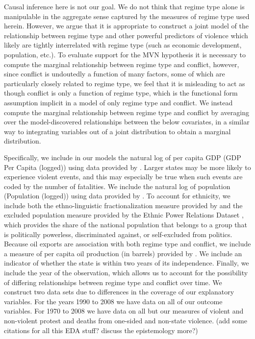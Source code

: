 \documentclass[titlepage, onecolumn,12pt]{article}
\begin{document}
Causal inference here is not our goal. We do not think that regime type alone is manipulable in the aggregate sense captured by the measures of regime type used herein. However, we argue that it is appropriate to construct a joint model of the relationship between regime type and other powerful predictors of violence which likely are tightly interrelated with regime type (such as economic development, population, etc.). To evaluate support for the MVN hypothesis it is necessary to compute the marginal relationship between regime type and conflict, however, since conflict is undoutedly a function of many factors, some of which are particularly closely related to regime type, we feel that it is misleading to act as though conflict is only a function of regime type, which is the functional form assumption implicit in a model of only regime type and conflict. We instead compute the marginal relationship between regime type and conflict by averaging over the model-discovered relationships between the below covariates, in a similar way to integrating variables out of a joint distribution to obtain a marginal distribution.

Specifically, we include in our models the natural log of per capita GDP {\sc (GDP Per Capita (logged))} using data provided by \citep{gleditsch2002expanded}. Larger states may be more likely to experience violent events, and this may especially be true when such events are coded by the number of fatalities. We include the natural log of population {\sc (Population (logged))} using data provided by \citep{gleditsch2002expanded}. To account for ethnicity, we include both the ethno-linguistic fractionalization measure provided by \citep{fearon2003ethnic} and the excluded population measure provided by the Ethnic Power Relations Dataset \citep{wimmer2009ethnic}, which provides the share of the national population that belongs to a group that is politically powerless, discriminated against, or self-excluded from politics. Because oil exports are association with both regime type and conflict, we include a measure of per capita oil production (in barrels) provided by \citet{wimmer2009ethnic}. We include an indicator of whether the state is within two years of its independence. Finally, we include the year of the observation, which allows us to account for the possibility of differing relationships between regime type and conflict over time. We construct two data sets due to differences in the coverage of our explanatory variables. For the years 1990 to 2008 we have data on all of our outcome variables. For 1970 to 2008 we have data on all but our measures of violent and non-violent protest and deaths from one-sided and non-state violence. (add some citations for all this EDA stuff? discuss the epistemology more?)
\end{document}
